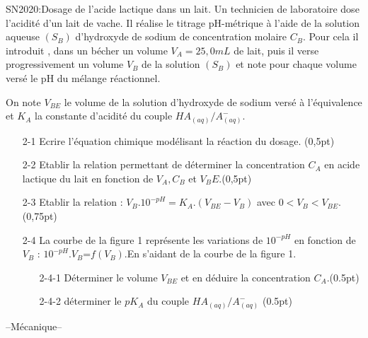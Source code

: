 \documentclass[12pt]{article}
\begin{document}
\begin{Box2}{SN2020:Dosage de l’acide lactique dans un lait.}
  Un technicien de laboratoire dose l’acidité d’un lait de vache. Il réalise le titrage pH-métrique à l’aide de la
  solution aqueuse $(S_B)$ d’hydroxyde de sodium de concentration molaire $C_B$. Pour cela il introduit , dans un
bécher un volume $V_A = 25,0mL$
de lait, puis il verse progressivement un volume $V_B$
de la solution $(S_B)$ et note
pour chaque volume versé le pH du mélange réactionnel.

On note $V_{BE}$
le volume de la solution d’hydroxyde de sodium versé à l’équivalence et
  $K_A$ la constante d’acidité du couple $HA_{(aq)}/ A^-_{(aq)}$.

  \begin{enumerate}
    \item[2-1] Ecrire l’équation chimique modélisant la réaction du dosage. (0,5pt)
    \item[2-2] Etablir la relation permettant de déterminer la concentration $C_A$ en acide lactique du lait en fonction de $V_A, C_B$ et $V_BE$.(0,5pt)
    \item[2-3] Etablir la relation : $V_B.10^{-pH} = K_A.(V_{BE} - V_B)$ avec $0<V_B<V_{BE}$.(0,75pt)
    \item[2-4] La courbe de la figure 1 représente les variations de $10^{-pH}$ en fonction de $V_B$ : $10^{-pH}.V_B$=$ f(V_B)$.En s’aidant de la courbe de la figure 1.
      \begin{enumerate}
        \item[2-4-1] Déterminer le volume $V_{BE}$ et en déduire la concentration $C_A$.(0.5pt)
        \item[2-4-2] déterminer le $pK_A$ du couple $HA_{(aq)}/ A^-_{(aq)}$ (0.5pt)
      \end{enumerate}
  \end{enumerate}


\end{Box2}
\begin{center}
 \hrulefill
  \Large{--Mécanique--}
\hrulefill\\

\end{center}
\end{document}

